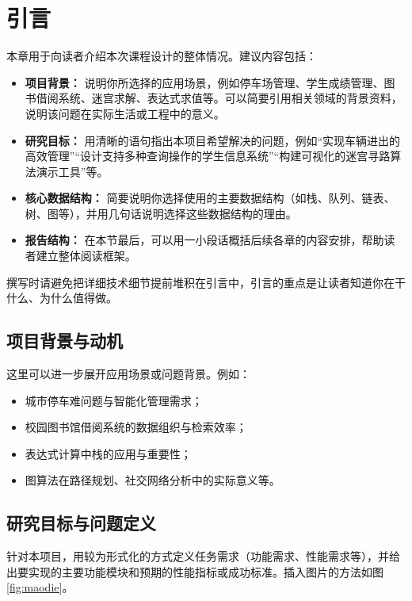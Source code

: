 \documentclass[a4paper,12pt,twoside]{ctexrep}
\begin{document}
\cleardoublepage
\chapter{引言}

本章用于向读者介绍本次课程设计的整体情况。建议内容包括：

\begin{itemize}
  \item \textbf{项目背景：} 说明你所选择的应用场景，例如停车场管理、学生成绩管理、图书借阅系统、迷宫求解、表达式求值等。可以简要引用相关领域的背景资料，说明该问题在实际生活或工程中的意义。
  \item \textbf{研究目标：} 用清晰的语句指出本项目希望解决的问题，例如“实现车辆进出的高效管理”“设计支持多种查询操作的学生信息系统”“构建可视化的迷宫寻路算法演示工具”等。
  \item \textbf{核心数据结构：} 简要说明你选择使用的主要数据结构（如栈、队列、链表、树、图等），并用几句话说明选择这些数据结构的理由。
  \item \textbf{报告结构：} 在本节最后，可以用一小段话概括后续各章的内容安排，帮助读者建立整体阅读框架。
\end{itemize}

撰写时请避免把详细技术细节提前堆积在引言中，引言的重点是让读者知道你在干什么、为什么值得做。

\section{项目背景与动机}

这里可以进一步展开应用场景或问题背景。例如：

\begin{itemize}
  \item 城市停车难问题与智能化管理需求；
  \item 校园图书馆借阅系统的数据组织与检索效率；
  \item 表达式计算中栈的应用与重要性；
  \item 图算法在路径规划、社交网络分析中的实际意义等。
\end{itemize}

\section{研究目标与问题定义}

针对本项目，用较为形式化的方式定义任务需求（功能需求、性能需求等），并给出要实现的主要功能模块和预期的性能指标或成功标准。插入图片的方法如图\ref{fig:maodie}。
\end{document}
